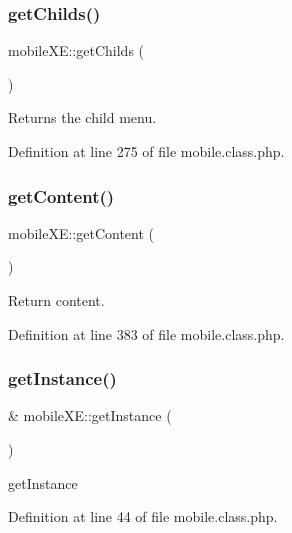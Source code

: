\subsubsection{\texorpdfstring{get\+Childs()}{getChilds()}}
{\footnotesize\ttfamily mobile\+X\+E\+::get\+Childs (\begin{DoxyParamCaption}{ }\end{DoxyParamCaption})}



Returns the child menu. 



Definition at line 275 of file mobile.\+class.\+php.

\hypertarget{classmobileXE_aef1ad977cdc5f504ddafd1c6c6272cc1}{}\label{classmobileXE_aef1ad977cdc5f504ddafd1c6c6272cc1} 
\subsubsection{\texorpdfstring{get\+Content()}{getContent()}}
{\footnotesize\ttfamily mobile\+X\+E\+::get\+Content (\begin{DoxyParamCaption}{ }\end{DoxyParamCaption})}



Return content. 



Definition at line 383 of file mobile.\+class.\+php.

\hypertarget{classmobileXE_a11db662f7f05a929e2559ee6d42fca2c}{}\label{classmobileXE_a11db662f7f05a929e2559ee6d42fca2c} 
\subsubsection{\texorpdfstring{get\+Instance()}{getInstance()}}
{\footnotesize\ttfamily \& mobile\+X\+E\+::get\+Instance (\begin{DoxyParamCaption}{ }\end{DoxyParamCaption})}



get\+Instance 



Definition at line 44 of file mobile.\+class.\+php.

\hypertarget{classmobileXE_a482a65d3f684a18d5769f9951ac2741e}{}\label{classmobileXE_a482a65d3f684a18d5769f9951ac2741e} 
